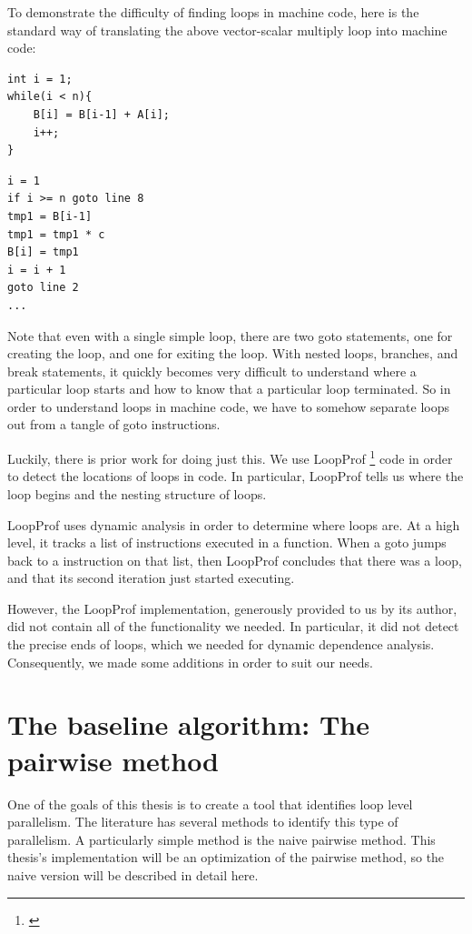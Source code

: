 \documentclass[12pt,twoside]{reedthesis}
\begin{document}
		To demonstrate the difficulty of finding loops in machine code, here is the standard way of translating the above vector-scalar multiply loop into machine code:
		

		\begin{lstlisting}
int i = 1;
while(i < n){
	B[i] = B[i-1] + A[i];
	i++;
}
		\end{lstlisting}
		\begin{lstlisting}
i = 1
if i >= n goto line 8
tmp1 = B[i-1]
tmp1 = tmp1 * c
B[i] = tmp1
i = i + 1
goto line 2
...
		\end{lstlisting} 
		
		Note that even with a single simple loop, there are two goto statements, one for creating the loop, and one for exiting the loop. With nested loops, branches, and break statements, it quickly becomes very difficult to understand where a particular loop starts and how to know that a particular loop terminated.
		So in order to understand loops in machine code, we have to somehow separate loops out from a tangle of goto instructions. 
		
		Luckily, there is prior work for doing just this. We use LoopProf \footnote{\cite{Chen:2004}} code in order to detect the locations of loops in code. In particular, LoopProf tells us where the loop begins and the nesting structure of loops. 
		
		LoopProf uses dynamic analysis in order to determine where loops are. At a high level, it tracks a list of instructions executed in a function. When a goto jumps back to a instruction on that list, then LoopProf concludes that there was a loop, and that its second iteration just started executing. 
		
		However, the LoopProf implementation, generously provided to us by its author, did not contain all of the functionality we needed. In particular, it did not detect the precise ends of loops, which we needed for dynamic dependence analysis. Consequently, we made some additions in order to suit our needs. 
		
	\section{The baseline algorithm: The pairwise method}
	
		One of the goals of this thesis is to create a tool that identifies loop level parallelism. The literature has several methods to identify this type of parallelism. A particularly simple method is the naive pairwise method. This thesis's implementation will be an optimization of the pairwise method, so the naive version will be described in detail here. 
		
\end{document}
